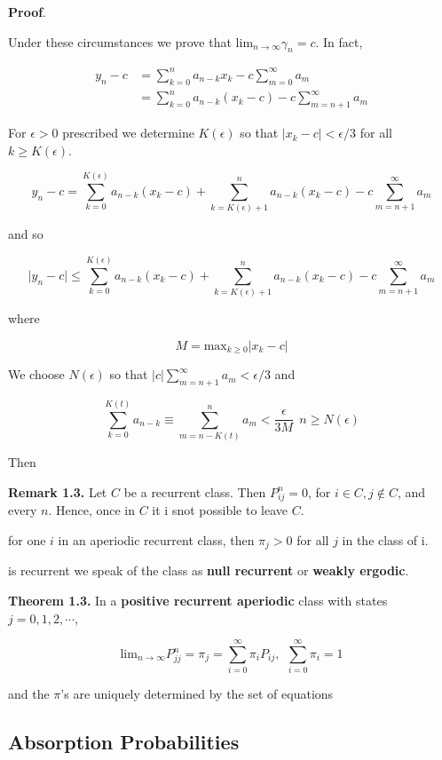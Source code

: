 \documentclass[12pt]{article}
\theoremstyle{nonumberbreak}
\begin{document}
\textbf{Proof}. 


Under these circumstances we prove that $\mathrm{lim}_{n\to\infty} \gamma_n = c$. In fact,

$$
\begin{aligned}
y_n - c &= \sum_{k=0}^n a_{n-k} x_k - c\sum_{m=0}^\infty a_m \\[8pt]
&= \sum_{k=0}^n a_{n-k} (x_k -c) - c \sum_{m=n+1}^\infty a_m
\end{aligned}
$$

For $\epsilon >0$ prescribed we determine $K(\epsilon)$ so that $\vert x_k - c \vert < \epsilon / 3$ for all $k \ge K(\epsilon)$. 

$$
y_n - c = \sum_{k=0}^{K(\epsilon)} a_{n-k} (x_k -c) + \sum_{k=K(\epsilon)+1}^n a_{n-k} (x_k -c) - c \sum_{m=n+1}^\infty a_m
$$

and so 

$$
\vert y_n - c \vert \le \sum_{k=0}^{K(\epsilon)} a_{n-k} (x_k -c) + \sum_{k=K(\epsilon)+1}^n a_{n-k} (x_k -c) - c \sum_{m=n+1}^\infty a_m
$$

where 

$$
M = \mathrm{max}_{k \ge 0} \vert x_k - c \vert
$$


We choose $N(\epsilon)$ so that $|c| \sum_{m=n+1}^\infty a_m < \epsilon /3$ and 

$$
\sum_{k=0}^{K(t)} a_{n-k} \equiv \sum_{m=n-K(t)}^n a_m < \frac{\epsilon}{3M} \ \ n \ge N(\epsilon)
$$

Then 


\textbf{Remark 1.3.} Let $C$ be a recurrent class. Then $P_{ij}^n = 0$, for $i \in C, j \notin C$, and every $n$. Hence, once in $C$ it i snot possible to leave $C$. 

for one $i$ in an aperiodic recurrent class, then $\pi_j > 0$ for all $j$ in the class of i.


is recurrent we speak of the class as \textbf{null recurrent} or \textbf{weakly ergodic}.


\begin{theorem}
\textbf{Theorem 1.3.} In a \textbf{positive recurrent aperiodic} class with states $j=0,1,2,\cdots$, 

$$
\mathrm{lim}_{n\to \infty} P^n_{jj} = \pi_j = \sum_{i=0}^\infty \pi_i P_{ij}, \ \ \sum_{i=0}^\infty \pi_i =1
$$

and the $\pi$'s are uniquely determined by the set of equations
\end{theorem}



\subsection{Absorption Probabilities}
\end{document}
